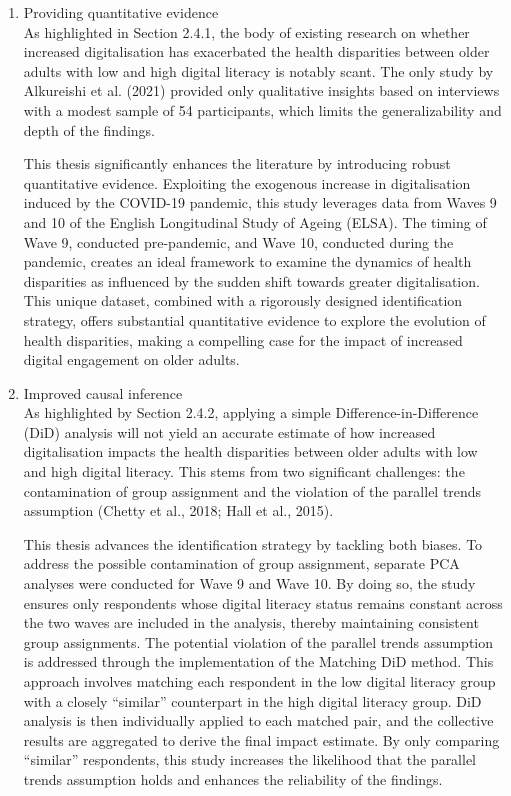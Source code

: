 \begin{enumerate}[wide=0pt, leftmargin=*, labelwidth=0pt, labelindent=\parindent, itemindent=0pt]
    \item Providing quantitative evidence \\
    As highlighted in Section 2.4.1, the body of existing research on whether increased digitalisation has exacerbated the health disparities between older adults with low and high digital literacy is notably scant. The only study by Alkureishi et al. (2021) provided only qualitative insights based on interviews with a modest sample of 54 participants, which limits the generalizability and depth of the findings.

    This thesis significantly enhances the literature by introducing robust quantitative evidence. Exploiting the exogenous increase in digitalisation induced by the COVID-19 pandemic, this study leverages data from Waves 9 and 10 of the English Longitudinal Study of Ageing (ELSA). The timing of Wave 9, conducted pre-pandemic, and Wave 10, conducted during the pandemic, creates an ideal framework to examine the dynamics of health disparities as influenced by the sudden shift towards greater digitalisation. This unique dataset, combined with a rigorously designed identification strategy, offers substantial quantitative evidence to explore the evolution of health disparities, making a compelling case for the impact of increased digital engagement on older adults.

    \item Improved causal inference \\
    As highlighted by Section 2.4.2, applying a simple Difference-in-Difference (DiD) analysis will not yield an accurate estimate of how increased digitalisation impacts the health disparities between older adults with low and high digital literacy. This stems from two significant challenges: the contamination of group assignment and the violation of the parallel trends assumption (Chetty et al., 2018; Hall et al., 2015).

    This thesis advances the identification strategy by tackling both biases. To address the possible contamination of group assignment, separate PCA analyses were conducted for Wave 9 and Wave 10. By doing so, the study ensures only respondents whose digital literacy status remains constant across the two waves are included in the analysis, thereby maintaining consistent group assignments. The potential violation of the parallel trends assumption is addressed through the implementation of the Matching DiD method. This approach involves matching each respondent in the low digital literacy group with a closely ``similar” counterpart in the high digital literacy group. DiD analysis is then individually applied to each matched pair, and the collective results are aggregated to derive the final impact estimate. By only comparing ``similar” respondents, this study increases the likelihood that the parallel trends assumption holds and enhances the reliability of the findings. 
\end{enumerate}


